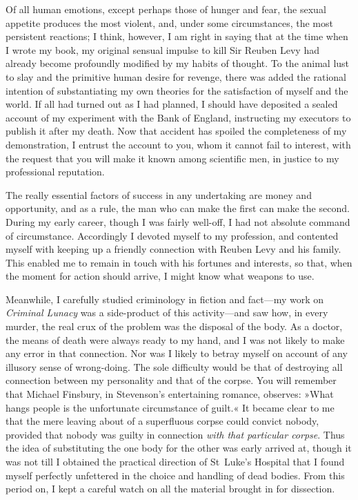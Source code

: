 Of all human emotions, except perhaps those of hunger and fear, the sexual appetite produces the most violent, and, under some circumstances, the most persistent reactions; I think, however, I am right in saying that at the time when I wrote my book, my original sensual impulse to kill Sir Reuben Levy had already become profoundly modified by my habits of thought. To the animal lust to slay and the primitive human desire for revenge, there was added the rational intention of substantiating my own theories for the satisfaction of myself and the world. If all had turned out as I had planned, I should have deposited a sealed account of my experiment with the Bank of England, instructing my executors to publish it after my death. Now that accident has spoiled the completeness of my demonstration, I entrust the account to you, whom it cannot fail to interest, with the request that you will make it known among scientific men, in justice to my professional reputation.

The really essential factors of success in any undertaking are money and opportunity, and as a rule, the man who can make the first can make the second. During my early career, though I was fairly well-off, I had not absolute command of circumstance. Accordingly I devoted myself to my profession, and contented myself with keeping up a friendly connection with Reuben Levy and his family. This enabled me to remain in touch with his fortunes and interests, so that, when the moment for action should arrive, I might know what weapons to use.

Meanwhile, I carefully studied criminology in fiction and fact—my work on \textit{Criminal Lunacy} was a side-product of this activity—and saw how, in every murder, the real crux of the problem was the disposal of the body. As a doctor, the means of death were always ready to my hand, and I was not likely to make any error in that connection. Nor was I likely to betray myself on account of any illusory sense of wrong-doing. The sole difficulty would be that of destroying all connection between my personality and that of the corpse. You will remember that Michael Finsbury, in Stevenson's entertaining romance, observes: »What hangs people is the unfortunate circumstance of guilt.« It became clear to me that the mere leaving about of a superfluous corpse could convict nobody, provided that nobody was guilty in connection \textit{with that particular corpse}. Thus the idea of substituting the one body for the other was early arrived at, though it was not till I obtained the practical direction of St~Luke's Hospital that I found myself perfectly unfettered in the choice and handling of dead bodies. From this period on, I kept a careful watch on all the material brought in for dissection.

